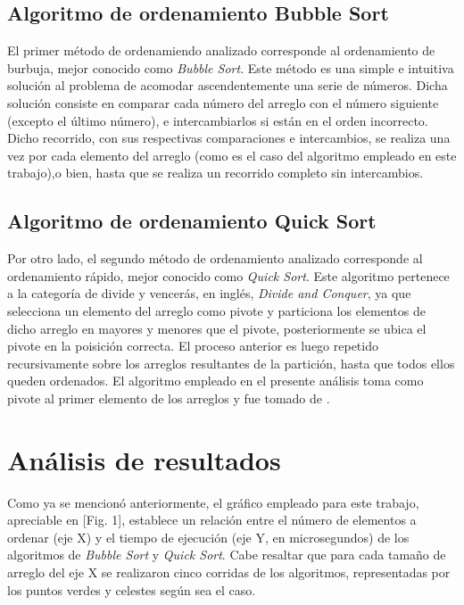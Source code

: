 \documentclass[conference]{IEEEtran}
\begin{document}
\subsection{Algoritmo de ordenamiento Bubble Sort}

El primer método de ordenamiendo analizado corresponde al ordenamiento de burbuja, mejor conocido como \textit{Bubble Sort}.
Este método es una simple e intuitiva solución al problema de acomodar ascendentemente una serie de números. 
Dicha solución consiste en comparar cada número del arreglo con el número siguiente
 (excepto el último número), e intercambiarlos si están en el orden incorrecto. Dicho recorrido, con 
sus respectivas comparaciones e intercambios, se realiza una vez por cada elemento del arreglo
 (como es el caso del algoritmo empleado en este trabajo),o bien, hasta que se realiza un recorrido completo sin intercambios.

\subsection{Algoritmo de ordenamiento Quick Sort}

Por otro lado, el segundo método de ordenamiento analizado corresponde al ordenamiento rápido, mejor conocido
como \textit{Quick Sort}. Este algoritmo pertenece a la categoría de divide y vencerás, en inglés, \textit{Divide and Conquer},
ya que selecciona un elemento del arreglo como pivote y particiona los elementos de dicho arreglo en mayores y menores que el 
pivote, posteriormente se ubica el pivote en la poisición correcta\cite{b1}. El proceso anterior es luego repetido recursivamente sobre
los arreglos resultantes de la partición, hasta que todos ellos queden ordenados. El algoritmo empleado en el presente 
análisis toma como pivote al primer elemento de los arreglos y fue tomado de \cite{b1}.\\

\section{Análisis de resultados}
Como ya se mencionó anteriormente, el gráfico empleado para este trabajo, apreciable en [Fig. 1], establece un relación entre
 el número de elementos a ordenar (eje X) y el tiempo de ejecución (eje Y, en microsegundos) de los algoritmos de
 \textit{Bubble Sort} y \textit{Quick Sort}. Cabe resaltar que para cada tamaño de arreglo del eje X se realizaron cinco corridas de
los algoritmos, representadas por los puntos verdes y celestes según sea el caso.
\end{document}
